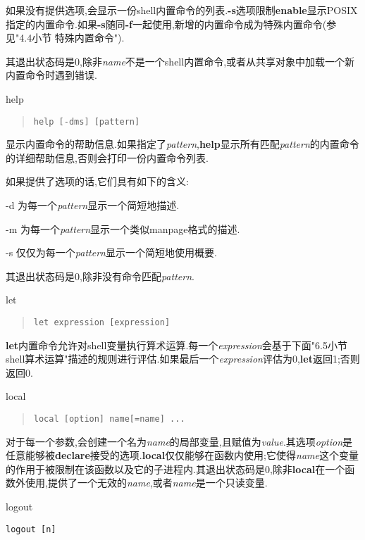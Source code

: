 \documentclass[draft,openany]{book}
\begin{document}
\begin{CJK}{UTF8}{gbsn}
\begin{basedescript}{\desclabelstyle{\nextlinelabel}\desclabelwidth{2.5em}}
        如果没有提供选项,会显示一份shell内置命令的列表.\textbf{-s}选项限制\textbf{enable}显示POSIX指定的内置命令.如果\textbf{-s}随同\textbf{-f}一起使用,新增的内置命令成为特殊内置命令(参见"4.4小节 特殊内置命令").\par
        其退出状态码是0,除非\emph{name}不是一个shell内置命令,或者从共享对象中加载一个新内置命令时遇到错误.
    \item[help]
        \begin{quote}
            \verb+help [-dms] [pattern]+
        \end{quote}
        显示内置命令的帮助信息.如果指定了\emph{pattern},\textbf{help}显示所有匹配\emph{pattern}的内置命令的详细帮助信息,否则会打印一份内置命令列表.\par
        如果提供了选项的话,它们具有如下的含义:
        \begin{basedescript}{\desclabelstyle{\nextlinelabel}\desclabelwidth{2.5em}}
        \item[-d] 为每一个\emph{pattern}显示一个简短地描述.
        \item[-m] 为每一个\emph{pattern}显示一个类似manpage格式的描述.
        \item[-s] 仅仅为每一个\emph{pattern}显示一个简短地使用概要.
        \end{basedescript}
        其退出状态码是0,除非没有命令匹配\emph{pattern}.
    \item[let]
        \begin{quote}
            \verb+let expression [expression]+
        \end{quote}
        \textbf{let}内置命令允许对shell变量执行算术运算.每一个\emph{expression}会基于下面"6.5小节 shell算术运算"描述的规则进行评估.如果最后一个\emph{expression}评估为0,\textbf{let}返回1;否则返回0.
    \item[local]
        \begin{quote}
            \verb+local [option] name[=name] ...+
        \end{quote}
        对于每一个参数,会创建一个名为\emph{name}的局部变量,且赋值为\emph{value}.其选项\emph{option}是任意能够被\textbf{declare}接受的选项.\textbf{local}仅仅能够在函数内使用;它使得\emph{name}这个变量的作用于被限制在该函数以及它的子进程内.其退出状态码是0,除非\textbf{local}在一个函数外使用,提供了一个无效的\emph{name},或者\emph{name}是一个只读变量.
    \item[logout]
        \begin{basedescript}{\desclabelstyle{\nextlinelabel}\desclabelwidth{2.5em}}
            \verb+logout [n]+
        \end{basedescript}

\end{basedescript}
\end{CJK}
\end{document}
